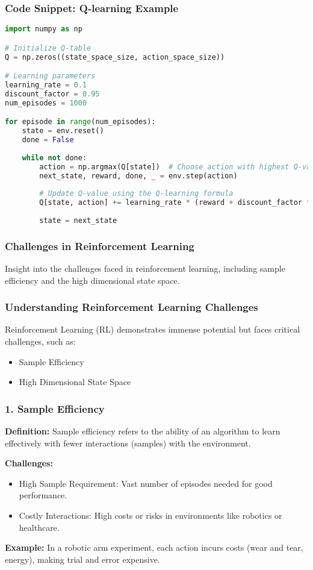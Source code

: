 \documentclass{beamer}
\begin{document}
\begin{frame}[fragile]
    \frametitle{Code Snippet: Q-learning Example}
    \begin{lstlisting}[language=Python]
import numpy as np

# Initialize Q-table
Q = np.zeros((state_space_size, action_space_size))

# Learning parameters
learning_rate = 0.1
discount_factor = 0.95
num_episodes = 1000

for episode in range(num_episodes):
    state = env.reset()
    done = False
    
    while not done:
        action = np.argmax(Q[state])  # Choose action with highest Q-value
        next_state, reward, done, _ = env.step(action)
      
        # Update Q-value using the Q-learning formula
        Q[state, action] += learning_rate * (reward + discount_factor * np.max(Q[next_state]) - Q[state, action])
        
        state = next_state
    \end{lstlisting}
\end{frame}

\begin{frame}[fragile]
    \frametitle{Challenges in Reinforcement Learning}
    Insight into the challenges faced in reinforcement learning, including sample efficiency and the high dimensional state space.
\end{frame}

\begin{frame}[fragile]
    \frametitle{Understanding Reinforcement Learning Challenges}
    Reinforcement Learning (RL) demonstrates immense potential but faces critical challenges, such as:
    
    \begin{itemize}
        \item Sample Efficiency
        \item High Dimensional State Space
    \end{itemize}
\end{frame}

\begin{frame}[fragile]
    \frametitle{1. Sample Efficiency}
    \textbf{Definition:} Sample efficiency refers to the ability of an algorithm to learn effectively with fewer interactions (samples) with the environment.

    \textbf{Challenges:}
    \begin{itemize}
        \item High Sample Requirement: Vast number of episodes needed for good performance.
        \item Costly Interactions: High costs or risks in environments like robotics or healthcare.
    \end{itemize}

    \textbf{Example:} 
    In a robotic arm experiment, each action incurs costs (wear and tear, energy), making trial and error expensive.
\end{frame}
\end{document}
